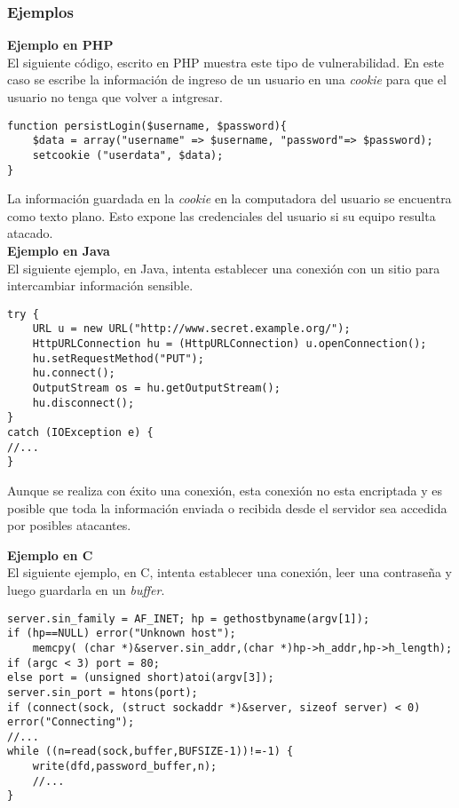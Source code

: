\subsubsection{Ejemplos}

\noindent \textbf{Ejemplo en PHP}\\

El siguiente código, escrito en PHP muestra este tipo de vulnerabilidad.
En este caso se escribe la información de ingreso de un usuario en una \textit{cookie} para que el usuario no tenga que volver a intgresar.
\begin{lstlisting}[frame=single]
function persistLogin($username, $password){
    $data = array("username" => $username, "password"=> $password);
    setcookie ("userdata", $data);
}
\end{lstlisting}

La información guardada en la \textit{cookie} en la computadora del usuario se encuentra como texto plano.
Esto expone las credenciales del usuario si su equipo resulta atacado. \\

\noindent \textbf{Ejemplo en Java}\\

El siguiente ejemplo, en Java, intenta establecer una conexión con un sitio para intercambiar información sensible.

\begin{lstlisting}[frame=single]
try {
	URL u = new URL("http://www.secret.example.org/");
	HttpURLConnection hu = (HttpURLConnection) u.openConnection();
	hu.setRequestMethod("PUT");
	hu.connect();
	OutputStream os = hu.getOutputStream();
	hu.disconnect();
}
catch (IOException e) {
//...
}
\end{lstlisting}

Aunque se realiza con éxito una conexión, esta conexión no esta encriptada y es posible que toda la información enviada o recibida desde el servidor sea accedida por posibles atacantes.

\noindent \textbf{Ejemplo en C}\\

El siguiente ejemplo, en C, intenta establecer una conexión, leer una contraseña y luego guardarla en un \textit{buffer}.

\begin{lstlisting}[frame=single]
server.sin_family = AF_INET; hp = gethostbyname(argv[1]);
if (hp==NULL) error("Unknown host");
    memcpy( (char *)&server.sin_addr,(char *)hp->h_addr,hp->h_length);
if (argc < 3) port = 80;
else port = (unsigned short)atoi(argv[3]);
server.sin_port = htons(port);
if (connect(sock, (struct sockaddr *)&server, sizeof server) < 0) error("Connecting");
//...
while ((n=read(sock,buffer,BUFSIZE-1))!=-1) {
	write(dfd,password_buffer,n);
	//...
}
\end{lstlisting}


